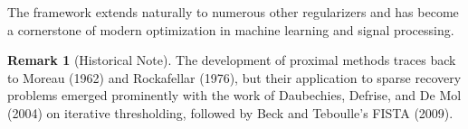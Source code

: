 \documentclass[12pt]{article}
\theoremstyle{definition}
\newtheorem{remark}{Remark}[section]
\begin{document}
The framework extends naturally to numerous other regularizers and has become a cornerstone of modern optimization in machine learning and signal processing.

\begin{remark}[Historical Note]
    The development of proximal methods traces back to Moreau (1962) and Rockafellar (1976), but their application to sparse recovery problems emerged prominently with the work of Daubechies, Defrise, and De Mol (2004) on iterative thresholding, followed by Beck and Teboulle's FISTA (2009).
\end{remark}

\end{document}
